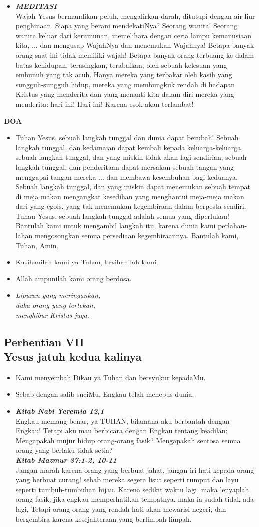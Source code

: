 \documentclass[a5paper,titlepage,11pt,openany]{scrbook}
\newcommand{\BU}[1]{\begin{itemize} \item[U:] #1 \end{itemize}}
\newcommand{\BP}[1]{\begin{itemize} \item[P:] #1 \end{itemize}}
\newcommand{\kamiMenyembah}{\BP{ Kami menyembah Dikau ya Tuhan dan bersyukur kepadaMu.}
\BU{Sebab dengan salib suciMu, Engkau telah menebus dunia.}
}
\newcommand{\kasihanilahKami}{\BP{Kasihanilah kami ya Tuhan, kasihanilah kami.}
\BU{Allah ampunilah kami orang berdosa.}}
\newcommand{\BPi}[2]
{\begin{itemize} \item[P1:] \textbf{\emph{#1}}\\#2 \end{itemize}}
\newcommand{\BPii}[1]
{\begin{itemize} \item[P2:] \textbf{\emph{MEDITASI}}\\#1 \end{itemize}}
\newcommand{\lagu}[2]{%
\begin{itemize}
\item[#1.] \it{#2}
\end{itemize}}
\newcommand{\henti}[2]{%
\subsection*{Perhentian #1\\#2 } 
\kamiMenyembah
}
\begin{document}
\BPii{
Wajah Yesus bermandikan peluh, mengalirkan darah, ditutupi dengan air liur penghinaan. Siapa yang berani mendekatiNya? Seorang wanita! Seorang wanita keluar dari kerumunan, memelihara dengan ceria lampu kemanusiaan kita, ... dan mengusap WajahNya dan menemukan Wajahnya! Betapa banyak orang saat ini tidak memiliki wajah! Betapa banyak orang terbuang ke dalam batas kehidupan, terasingkan, terabaikan, oleh sebuah kelesuan yang embunuh yang tak acuh. Hanya mereka yang terbakar oleh kasih yang sungguh-sungguh hidup, mereka yang membungkuk rendah di hadapan Kristus yang menderita dan yang menanti kita dalam diri mereka yang menderita: hari ini! Hari ini! Karena esok akan terlambat!}

\textbf{DOA}

\BU{Tuhan Yesus, sebuah langkah tunggal dan dunia dapat berubah! Sebuah langkah tunggal, dan kedamaian dapat kembali kepada keluarga-keluarga, sebuah langkah tunggal, dan yang miskin tidak akan lagi sendirian; sebuah langkah tunggal, dan penderitaan dapat mersakan sebuah tangan yang menggapai tangan mereka ... dan membawa kesembuhan bagi keduanya. Sebuah langkah tunggal, dan yang miskin dapat menemukan sebuah tempat di meja makan mengangkat kesedihan yang menghantui meja-meja makan dari yang egois, yang tak menemukan kegembiraan dalam berpesta sendiri. Tuhan Yesus, sebuah langkah tunggal adalah semua yang diperlukan! Bantulah kami untuk mengambil langkah itu, karena dunia kami perlahan-lahan mengosongkan semua persediaan kegembiraannya. Bantulah kami, Tuhan, Amin.}

\kasihanilahKami

\lagu{7}{Lipuran yang meringankan,\\
duka orang yang tertekan,\\
menghibur Kristus juga.}

\henti{VII}{Yesus jatuh kedua kalinya}

\BPi{	Kitab Nabi Yeremia 12,1 }{
	Engkau memang benar, ya TUHAN, bilamana aku berbantah dengan Engkau! Tetapi aku mau berbicara dengan Engkau tentang keadilan: Mengapakah mujur hidup orang-orang fasik? Mengapakah sentosa semua orang yang berlaku tidak setia? \\
\textbf{\emph{Kitab Mazmur 37:1-2, 10-11 }}\\
	Jangan marah karena orang yang berbuat jahat, jangan iri hati kepada orang yang berbuat curang! sebab mereka segera lisut seperti rumput dan layu seperti tumbuh-tumbuhan hijau. Karena sedikit waktu lagi, maka lenyaplah orang fasik; jika engkau memperhatikan tempatnya, maka ia sudah tidak ada lagi, Tetapi orang-orang yang rendah hati akan mewarisi negeri, dan bergembira karena kesejahteraan yang berlimpah-limpah. }
\end{document}
